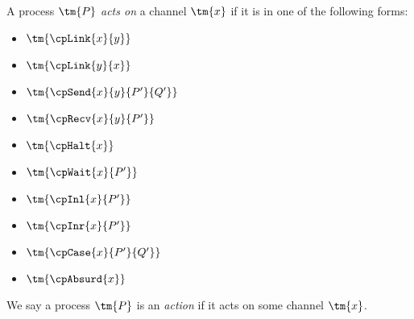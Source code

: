 \begin{definition}[Action]\label{def:cp-action}
  A process $\tm{P}$ \emph{acts on} a channel $\tm{x}$ if it is in one of the
  following forms:
  \begin{multicols}{3}
    \begin{itemize}[noitemsep,topsep=0pt,parsep=0pt,partopsep=0pt]
    \item $\tm{\cpLink{x}{y}}$
    \item $\tm{\cpLink{y}{x}}$
    \item $\tm{\cpSend{x}{y}{P'}{Q'}}$
    \item $\tm{\cpRecv{x}{y}{P'}}$
    \item $\tm{\cpHalt{x}}$
    \item $\tm{\cpWait{x}{P'}}$
    \item $\tm{\cpInl{x}{P'}}$
    \item $\tm{\cpInr{x}{P'}}$
    \item $\tm{\cpCase{x}{P'}{Q'}}$
    \item $\tm{\cpAbsurd{x}}$
    \end{itemize}
  \end{multicols}
  We say a process $\tm{P}$ is an \emph{action} if it acts on some channel $\tm{x}$.
\end{definition}
